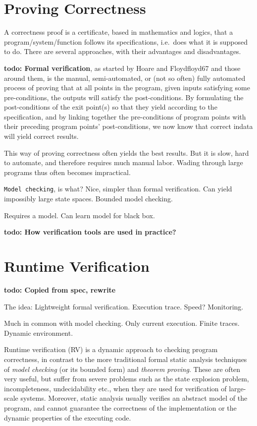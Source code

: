 \documentclass[a4paper,11pt]{kth-mag}
\newcommand{\todo}[1]{\textbf{todo: #1}}
\begin{document}
\section{Proving Correctness}

A correctness proof is a certificate, based in mathematics and logics, that a
program/system/function follows its specifications, i.e.\ does what it is
supposed to do. There are several approaches, with their advantages and
disadvantages.

\todo{Formal verification}, as started by Hoare \cite{hoare69} and
Floyd{floyd67} and those around them, is the manual, semi-automated, or (not so
often) fully automated process of proving that at all points in the program,
given inputs satisfying some pre-conditions, the outputs will satisfy the
post-conditions. By formulating the post-conditions of the exit point(s) so
that they yield according to the specification, and by linking together the
pre-conditions of program points with their preceding program points'
post-conditions, we now know that correct indata will yield correct results.

This way of proving correctness often yields the best results. But it is slow,
hard to automate, and therefore requires much manual labor. Wading through
large programs thus often becomes impractical.

\texttt{Model checking}, is what?  Nice, simpler than formal verification. Can
yield impossibly large state spaces. Bounded model checking.

Requires a model. Can learn model for black box.

\todo{How verification tools are used in practice?}

\section{Runtime Verification}\label{section-rv}

\todo{Copied from spec, rewrite}

The idea: Lightweight formal verification. Execution trace. Speed? Monitoring.

Much in common with model checking. Only current execution. Finite traces.
Dynamic environment.

Runtime verification (RV) is a dynamic approach to checking program
correctness, in contrast to the more traditional formal static analysis
techniques of \emph{model checking} (or its bounded form) and \emph{theorem
proving}. These are often very useful, but suffer from severe problems such as
the state explosion problem, incompleteness, undecidability etc., when they are
used for verification of large-scale systems.  Moreover, static analysis
usually verifies an abstract model of the program, and cannot guarantee the
correctness of the implementation or the dynamic properties of the executing
code.
\end{document}
